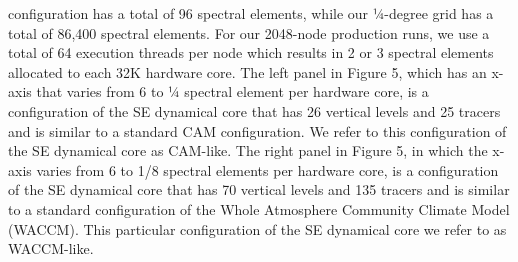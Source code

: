 

configuration has a total of 96 spectral elements, while our ¼-degree grid has a total of 86,400 spectral elements.  For our 2048-node production runs, we use a total of 64 execution threads per node which results in 2 or 3 spectral elements allocated to each 32K hardware core.  The left panel in Figure 5, which has an x-axis that varies from 6 to ¼ spectral element per hardware core, is a configuration of the SE dynamical core that has 26 vertical levels and 25 tracers and is similar to a standard CAM configuration.  We refer to this configuration of the SE dynamical core as CAM-like.  The right panel in Figure 5, in which the x-axis varies from 6 to 1/8 spectral elements per hardware core, is a configuration of the SE dynamical core that has 70 vertical levels and 135 tracers and is similar to a standard configuration of the Whole Atmosphere Community Climate Model (WACCM).  This particular configuration of the SE dynamical core we refer to as WACCM-like. 



